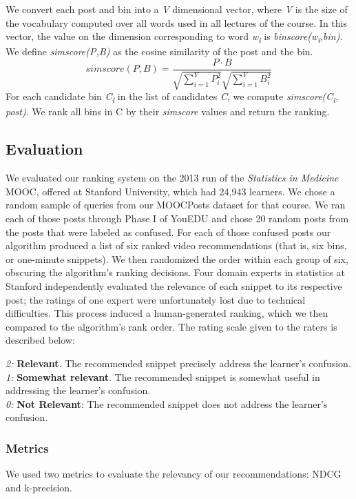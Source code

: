 \documentclass{edm_template}
\begin{document}
We convert each post and bin into a \textit{V} dimensional vector, where \textit{V} is the size of the vocabulary computed over all words used in all lectures of the course. In this vector, the value on the dimension corresponding to word  \textit{w\textsubscript i} is \textit{binscore(w\textsubscript i,bin)}. We define \textit{simscore(P,B)} as the cosine similarity of the post and the bin.
\begin{equation}
simscore(P,B) = \frac{P \cdot B}{\sqrt{\sum\limits_{i=1}^V P_i ^2} \sqrt{\sum\limits_{i=1}^V B_i ^2}  }
\end{equation}
For each candidate bin \textit{C\textsubscript i} in the list of candidates \textit{C}, we compute \textit{simscore(C\textsubscript i, post)}. We rank all bins in C by their \textit{simscore} values and return the ranking.

\subsection{Evaluation}

We evaluated our ranking system on the 2013 run of the \emph{Statistics in
Medicine} MOOC, offered at Stanford University, which had 24,943
learners. We chose a random sample of queries from our MOOCPosts
dataset for that course. We ran each of those posts through Phase I of
YouEDU and chose 20 random posts from the posts that were labeled as
confused. For each of those confused posts our algorithm produced a
list of six ranked video recommendations (that is, six bins, or
one-minute snippets). We then randomized the order within each group
of six, obscuring the algorithm's ranking decisions. Four domain
experts in statistics at Stanford independently evaluated the
relevance of each snippet to its respective post; the ratings of one expert were unfortunately lost due to technical difficulties. This process induced
a human-generated ranking, which we then compared to the algorithm's
rank order. The rating scale given to the raters is described
below:

\textit{2:} {\bf Relevant}. The recommended snippet precisely address the learner's confusion.\\
\textit{1:} {\bf Somewhat relevant}. The recommended snippet is somewhat useful in addressing the learner's confusion.\\
\textit{0:} {\bf Not Relevant}: The recommended snippet does not address the learner's confusion.

\subsubsection{Metrics}
We used two metrics to evaluate the relevancy of our recommendations: NDCG and k-precision.
\end{document}
